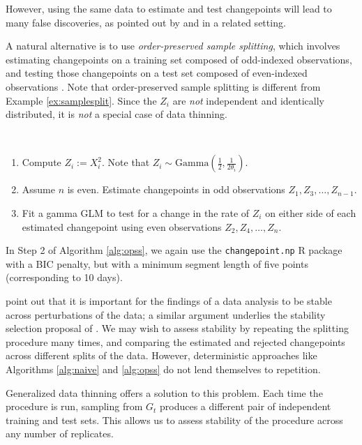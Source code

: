 \documentclass[12pt]{article}
\begin{document}
However, using the same data to estimate and test changepoints will lead to many false discoveries, as pointed out by \cite{hyun2021post} and \cite{jewell2022testing} in a related setting. 

A natural alternative is to use \emph{order-preserved sample splitting}, which involves estimating changepoints on a training set composed of odd-indexed observations, and testing those changepoints on a test set composed of even-indexed observations
\citep{10.1214/19-AOS1814}. 
Note that order-preserved sample splitting is different from Example \ref{ex:samplesplit}. Since the $Z_i$ are \emph{not} independent and identically distributed, it is \emph{not} a special case of data thinning.

\begin{algorithm}\label{alg:opss}
\textcolor{white}{.}
\begin{enumerate}
    \item Compute $Z_i := X_i^2$. Note that $Z_i  \sim \text{Gamma}\left(\frac{1}{2}, \frac{1}{2\theta_i}\right)$.
    \item Assume $n$ is even. Estimate changepoints in odd observations $Z_1,Z_3, \ldots,Z_{n-1}$.
    \item Fit a gamma GLM to test for a change in the rate of $Z_i$ on either side of each estimated changepoint using even observations $Z_2,Z_4, \ldots,Z_{n}$.
\end{enumerate}
\end{algorithm}

In Step 2 of Algorithm \ref{alg:opss}, we again use the \verb=changepoint.np= R package with a BIC penalty, but with a minimum segment length of five points (corresponding to 10 days).

\cite{yu2020veridical} point out that it is important for the findings of a data analysis to be stable across perturbations of the data; a similar argument underlies the  stability selection proposal of \cite{meinshausen2010stability}. We may wish to assess stability by repeating the splitting procedure many times, and comparing the estimated and rejected changepoints across different splits of the data. 
However, deterministic approaches like Algorithms \ref{alg:naive} and \ref{alg:opss} do not lend themselves to repetition.

Generalized data thinning offers a solution to this problem. Each time the procedure is run, sampling from $G_t$ produces a different pair of independent training and test sets. This allows us to assess stability of the procedure across any number of replicates.
\end{document}
